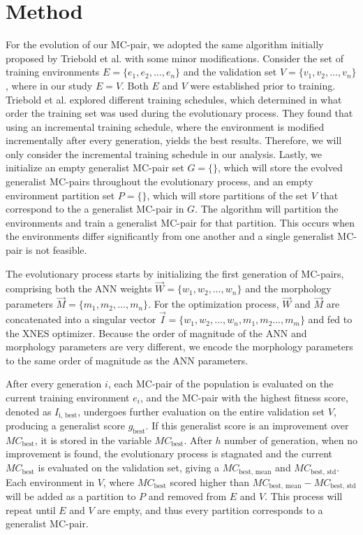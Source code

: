 \section{Method}
    For the evolution of our MC-pair, we adopted the same algorithm initially proposed by Triebold et al. \cite{Corinna_Triebold} with some minor modifications. Consider the set of training environments $E = \{e_1, e_2, \ldots, e_n\}$ and the validation set $V = \{v_1, v_2, \ldots, v_n\}$, where in our study $E = V$. Both $E$ and $V$ were established prior to training. Triebold et al. explored different training schedules, which determined in what order the training set was used during the evolutionary process. They found that using an incremental training schedule, where the environment is modified incrementally after every generation, yields the best results. Therefore, we will only consider the incremental training schedule in our analysis. Lastly, we initialize an empty generalist MC-pair set $G = \{\}$, which will store the evolved generalist MC-pairs throughout the evolutionary process, and an empty environment partition set $P = \{\}$, which will store partitions of the set $V$ that correspond to the a generalist MC-pair in $G$. The algorithm will partition the environments and train a generalist MC-pair for that partition. This occurs when the environments differ significantly from one another and a single generalist MC-pair is not feasible. 

    The evolutionary process starts by initializing the first generation of MC-pairs, comprising both the ANN weights $\overrightarrow{W} = \{w_1, w_2, \ldots, w_n\}$ and the morphology parameters $\overrightarrow{M} = \{m_1, m_2, \ldots, m_n\}$. For the optimization process, $\overrightarrow{W}$ and $\overrightarrow{M}$ are concatenated into a singular vector \newline $\overrightarrow{I} = \{w_1, w_2, \ldots, w_n, m_1, m_2 \ldots, m_m\}$ and fed to the XNES optimizer. Because the order of magnitude of the ANN and morphology parameters are very different, we encode the morphology parameters to the same order of magnitude as the ANN parameters.

    After every generation $i$, each MC-pair of the population is evaluated on the current training environment $e_i$, and the MC-pair with the highest fitness score, denoted as $I_{\text{i, best}}$, undergoes further evaluation on the entire validation set $V$, producing a generalist score $g_{\text{best}}$. If this generalist score is an improvement over $MC_{\text{best}}$, it is stored in the variable $MC_{\text{best}}$. After $h$ number of generation, when no improvement is found, the evolutionary process is stagnated and the current $MC_{\text{best}}$ is evaluated on the validation set, giving a $MC_{\text{best, mean}}$ and $MC_{\text{best, std}}$. Each environment in $V$, where $MC_{\text{best}}$ scored higher than $MC_{\text{best, mean}} - MC_{\text{best, std}}$ will be added as a partition to $P$ and removed from $E$ and $V$. This process will repeat until $E$ and $V$ are empty, and thus every partition corresponds to a generalist MC-pair. 

